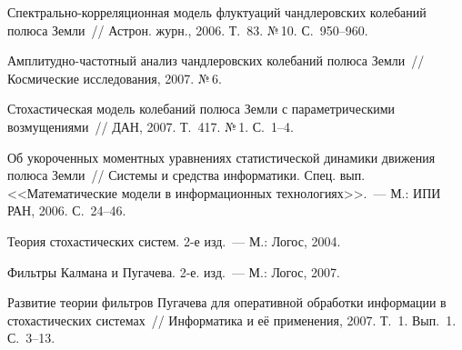 \begin{multicols}{2}
{{\begin{thebibliography}{99}
Спектрально-кор\-ре\-ля\-ци\-он\-ная
модель флуктуаций чандлеровских колебаний полюса Земли~//
Астрон. журн., 2006. Т.~83. №\,10. С.~950--960.

 Амплитудно-частотный анализ чандлеровских колебаний полюса 
Земли~// Космические исследования, 2007. №\,6.

 Стохастическая модель колебаний полюса Земли 
с параметрическими возмущениями~// ДАН, 2007. Т.~417. №\,1. С.~1--4.

Об укороченных моментных уравнениях статистической динамики движения
полюса Земли~// Системы и средства информатики. Спец. вып.
<<Математические модели в информационных технологиях>>.~---
М.: ИПИ РАН, 2006. С.~24--46.

Теория стохастических систем. 2-е изд.~--- М.: Логос, 2004.

 Фильтры Калмана и Пугачева. 2-е. изд.~--- М.: Логос, 2007.

Развитие теории фильтров Пугачева для оперативной обработки информации
в стохастических системах~//
Информатика и её применения, 2007. Т.~1. Вып.~1. С.~3--13.
\end{thebibliography}

}
}

\end{multicols}


\label{end\stat}
